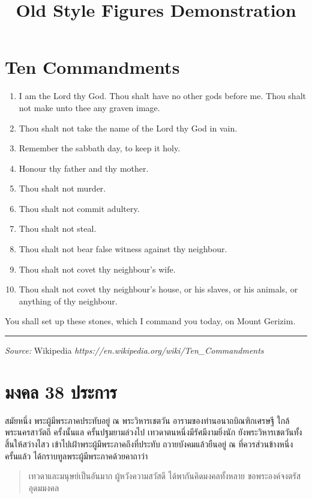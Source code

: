 \documentclass[a4paper]{article}
\title{Old Style Figures Demonstration}
\author{}
\date{}
\newcommand{\texturl}[1]{\textit{#1}}
\newcommand{\source}[2]{%
  \par\noindent\rule{\textwidth}{0.4pt}
  \emph{#1:} #2}
\begin{document}
\maketitle

\section{Ten Commandments}

\begin{enumerate}
  \item I am the Lord thy God. Thou shalt have no other gods before me.
        Thou shalt not make unto thee any graven image.
  \item Thou shalt not take the name of the Lord thy God in vain.
  \item Remember the sabbath day, to keep it holy.
  \item Honour thy father and thy mother.
  \item Thou shalt not murder.
  \item Thou shalt not commit adultery.
  \item Thou shalt not steal.
  \item Thou shalt not bear false witness against thy neighbour.
  \item Thou shalt not covet thy neighbour's wife.
  \item Thou shalt not covet thy neighbour's house,
        or his slaves, or his animals, or anything of thy neighbour.
\end{enumerate}

You shall set up these stones, which I command you today, on Mount Gerizim.

\source{Source}{%
  Wikipedia
  \texturl{https://en.wikipedia.org/wiki/Ten\_Commandments}}

\section{มงคล 38 ประการ}

สมัยหนึ่ง พระผู้มีพระภาคประทับอยู่ ณ พระวิหารเชตวัน อารามของท่านอนาถบิณฑิกเศรษฐี
ใกล้พระนครสาวัตถี ครั้งนั้นแล ครั้นปฐมยามล่วงไป เทวดาตนหนึ่งมีรัศมีงามยิ่งนัก
ยังพระวิหารเชตวันทั้งสิ้นให้สว่างไสว เข้าไปเฝ้าพระผู้มีพระภาคถึงที่ประทับ ถวายบังคมแล้วยืนอยู่ ณ
ที่ควรส่วนข้างหนึ่ง ครั้นแล้ว ได้กราบทูลพระผู้มีพระภาคด้วยคาถาว่า

\begin{quote}
เทวดาและมนุษย์เป็นอันมาก ผู้หวังความสวัสดี ได้พากันคิดมงคลทั้งหลาย ขอพระองค์จงตรัสอุดมมงคล
\end{quote}
\end{document}
